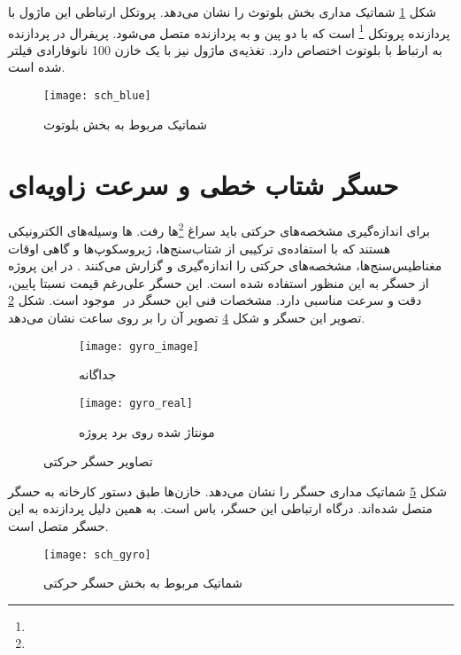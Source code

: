شکل \ref{fig:sch-blue} شماتیک مداری بخش بلوتوث را نشان می‌دهد. پروتکل ارتباطی این ماژول با پردازنده پروتکل
 \footnote{}
است که با دو پین  و  به پردازنده متصل می‌شود. پریفرال  در پردازنده به ارتباط با بلوتوث اختصاص دارد. تغذیه‌ی ماژول نیز با یک خازن 100 نانوفارادی فیلتر شده است.

\begin{figure}[h]
	\centering
	\texttt{[image: sch\_blue]}
	\caption{شماتیک مربوط به بخش بلوتوث}
	\label{fig:sch-blue}
\end{figure}




\section{حسگر شتاب خطی و سرعت زاویه‌ای}
برای اندازه‌گیری مشخصه‌های حرکتی باید سراغ
\footnote{}ها
رفت. ها وسیله‌های الکترونیکی هستند که با استفاده‌ی ترکیبی از شتاب‌سنج‌ها، ژیروسکوپ‌ها و گاهی اوقات مغناطیس‌سنج‌ها، مشخصه‌های حرکتی را اندازه‌گیری و گزارش می‌کنند \cite{IMU}. در این پروژه از حسگر  به این منظور استفاده شده است. این حسگر علی‌رغم قیمت نسبتا پایین، دقت و سرعت مناسبی دارد. مشخصات فنی این حسگر در ‌  موجود است. شکل \ref{fig:gyro_image} تصویر این حسگر و شکل \ref{fig:gyro_real} تصویر آن را بر روی \pcbf ساعت نشان می‌دهد.

\begin{figure}[h]
	\centering
	\begin{subfigure}{0.5\textwidth}
		\centering
		\texttt{[image: gyro\_image]}
		\caption{جداگانه}
		\label{fig:gyro_image}
	\end{subfigure}
	\begin{subfigure}{0.44\textwidth}
		\centering
		\texttt{[image: gyro\_real]}
		\caption{مونتاژ شده روی برد پروژه}
		\label{fig:gyro_real}
	\end{subfigure}
	\caption{تصاویر حسگر حرکتی}
\end{figure}

شکل \ref{fig:sch-gyro} شماتیک مداری حسگر  را نشان می‌دهد. خازن‌ها طبق دستور کارخانه به حسگر متصل شده‌اند. درگاه ارتباطی این حسگر، باس  است. به همین دلیل  پردازنده به این حسگر متصل است.

\begin{figure}[h]
	\centering
	\texttt{[image: sch\_gyro]}
	\caption{شماتیک مربوط به بخش حسگر حرکتی}
	\label{fig:sch-gyro}
\end{figure}


